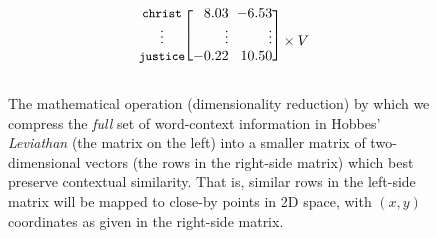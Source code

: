 \documentclass[11pt]{article}
\begin{document}
\begin{figure}[ht!]
\[\begin{blockarray}{c@{\hspace{2mm}}c@{\hspace{2mm}}c}
\begin{block}{c@{\hspace{2mm}}[r@{\hspace{2mm}}r]}
			\texttt{\small{christ}} & 8.03 & -6.53 \\
			\vdots & \vdots & \vdots \\
			\texttt{\small{justice}} & -0.22 & 10.50 \\
		\end{block}
	\end{blockarray}
	\times V %
	\]
	\caption{The mathematical operation (dimensionality reduction) by which we compress the \textit{full} set of word-context information in Hobbes' \textit{Leviathan} (the matrix on the left) into a smaller matrix of two-dimensional vectors (the rows in the right-side matrix) which best preserve contextual similarity. That is, similar rows in the left-side matrix will be mapped to close-by points in 2D space, with $(x,y)$ coordinates as given in the right-side matrix.}
\end{figure}


\end{document}
